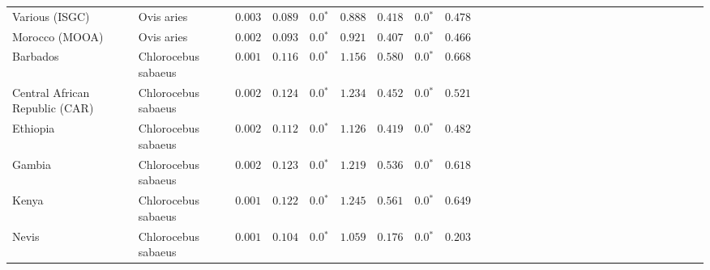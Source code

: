 \begin{center}
\begin{adjustbox}{width = 1\textwidth}
\begin{tabular}{|l|l|r|r|r|r|r|r|r|r|r|r|r|r|r|r|r|r|r|r|r|r|r|r|r|r|r|r|r|}
                 Various (ISGC) &           Ovis aries &           $ 0.003$ &                      $ 0.089$ &                  $\bm{0.0{^*}}$ &                                           $ 0.888$ &                      $ 0.418$ &                  $\bm{0.0{^*}}$ &                                           $ 0.478$ \\
                 Morocco (MOOA) &           Ovis aries &           $ 0.002$ &                      $ 0.093$ &                  $\bm{0.0{^*}}$ &                                           $ 0.921$ &                      $ 0.407$ &                  $\bm{0.0{^*}}$ &                                           $ 0.466$ \\
                       Barbados &  Chlorocebus sabaeus &           $ 0.001$ &                      $ 0.116$ &                  $\bm{0.0{^*}}$ &                                           $ 1.156$ &                      $ 0.580$ &                  $\bm{0.0{^*}}$ &                                           $ 0.668$ \\
 Central African Republic (CAR) &  Chlorocebus sabaeus &           $ 0.002$ &                      $ 0.124$ &                  $\bm{0.0{^*}}$ &                                           $ 1.234$ &                      $ 0.452$ &                  $\bm{0.0{^*}}$ &                                           $ 0.521$ \\
                       Ethiopia &  Chlorocebus sabaeus &           $ 0.002$ &                      $ 0.112$ &                  $\bm{0.0{^*}}$ &                                           $ 1.126$ &                      $ 0.419$ &                  $\bm{0.0{^*}}$ &                                           $ 0.482$ \\
                         Gambia &  Chlorocebus sabaeus &           $ 0.002$ &                      $ 0.123$ &                  $\bm{0.0{^*}}$ &                                           $ 1.219$ &                      $ 0.536$ &                  $\bm{0.0{^*}}$ &                                           $ 0.618$ \\
                          Kenya &  Chlorocebus sabaeus &           $ 0.001$ &                      $ 0.122$ &                  $\bm{0.0{^*}}$ &                                           $ 1.245$ &                      $ 0.561$ &                  $\bm{0.0{^*}}$ &                                           $ 0.649$ \\
                          Nevis &  Chlorocebus sabaeus &           $ 0.001$ &                      $ 0.104$ &                  $\bm{0.0{^*}}$ &                                           $ 1.059$ &                      $ 0.176$ &                  $\bm{0.0{^*}}$ &                                           $ 0.203$ \\

\end{tabular}
\end{adjustbox}
\end{center}
